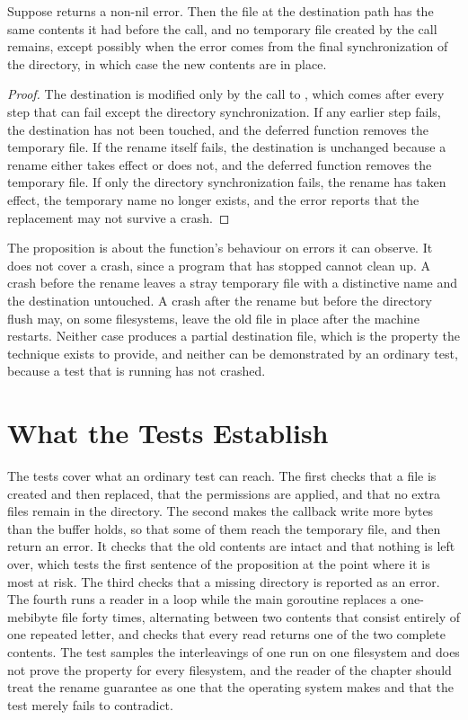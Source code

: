 \begin{proposition}\label{prop:atomic}
Suppose  returns a non-nil error. Then the file at the destination path has the same contents it had before the call, and no temporary file created by the call remains, except possibly when the error comes from the final synchronization of the directory, in which case the new contents are in place.
\end{proposition}

\begin{proof}
The destination is modified only by the call to , which comes after every step that can fail except the directory synchronization. If any earlier step fails, the destination has not been touched, and the deferred function removes the temporary file. If the rename itself fails, the destination is unchanged because a rename either takes effect or does not, and the deferred function removes the temporary file. If only the directory synchronization fails, the rename has taken effect, the temporary name no longer exists, and the error reports that the replacement may not survive a crash.
\end{proof}

The proposition is about the function's behaviour on errors it can observe. It does not cover a crash, since a program that has stopped cannot clean up. A crash before the rename leaves a stray temporary file with a distinctive name and the destination untouched. A crash after the rename but before the directory flush may, on some filesystems, leave the old file in place after the machine restarts. Neither case produces a partial destination file, which is the property the technique exists to provide, and neither can be demonstrated by an ordinary test, because a test that is running has not crashed.

\section{What the Tests Establish}


The tests cover what an ordinary test can reach. The first checks that a file is created and then replaced, that the permissions are applied, and that no extra files remain in the directory. The second makes the callback write more bytes than the buffer holds, so that some of them reach the temporary file, and then return an error. It checks that the old contents are intact and that nothing is left over, which tests the first sentence of the proposition at the point where it is most at risk. The third checks that a missing directory is reported as an error. The fourth runs a reader in a loop while the main goroutine replaces a one-mebibyte file forty times, alternating between two contents that consist entirely of one repeated letter, and checks that every read returns one of the two complete contents. The test samples the interleavings of one run on one filesystem and does not prove the property for every filesystem, and the reader of the chapter should treat the rename guarantee as one that the operating system makes and that the test merely fails to contradict.

